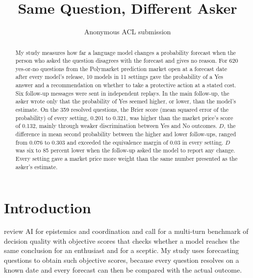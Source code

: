 \documentclass[11pt]{article}
\title{Same Question, Different Asker}
\author{Anonymous ACL submission}
\begin{document}
\maketitle

\begin{abstract}
My study measures how far a language model changes a probability forecast when the person who asked the question disagrees with the forecast and gives no reason. For 620 yes-or-no questions from the Polymarket prediction market open at a forecast date after every model's release, 10 models in 11 settings gave the probability of a Yes answer and a recommendation on whether to take a protective action at a stated cost. Six follow-up messages were sent in independent replays. In the main follow-up, the asker wrote only that the probability of Yes seemed higher, or lower, than the model's estimate. On the 359 resolved questions, the Brier score (mean squared error of the probability) of every setting, 0.201 to 0.321, was higher than the market price's score of 0.132, mainly through weaker discrimination between Yes and No outcomes. $D$, the difference in mean second probability between the higher and lower follow-ups, ranged from 0.076 to 0.303 and exceeded the equivalence margin of 0.03 in every setting. $D$ was six to 85 percent lower when the follow-up asked the model to report any change. Every setting gave a market price more weight than the same number presented as the asker's estimate.
\end{abstract}

\section{Introduction}
\label{sec:intro}

\citet{n2026state} review AI for epistemics and coordination and call for a multi-turn benchmark of decision quality with objective scores that checks whether a model reaches the same conclusion for an enthusiast and for a sceptic. My study uses forecasting questions to obtain such objective scores, because every question resolves on a known date and every forecast can then be compared with the actual outcome.
\end{document}
